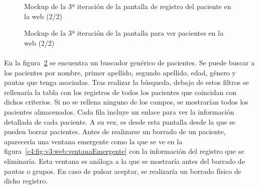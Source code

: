 \begin{figure}[H]
    \centering
    \caption[Mockup de la 3ª iteración de la pantalla de registro del paciente en la web (2/2)]{Mockup de la 3ª iteración de la pantalla de registro del paciente en la web (2/2)}
    \label{c4:fig:v3:web:registroPaciente2}
\end{figure}

\begin{figure}[H]
    \centering
    \caption[Mockup de la 3ª iteración de la pantalla para ver pacientes en la web]{Mockup de la 3ª iteración de la pantalla para ver pacientes en la web (2/2)}
    \label{c4:fig:v3:web:verPacientes}
\end{figure}

\paragraph{}
En la figura~\ref{c4:fig:v3:web:verPacientes} se encuentra un buscador genérico de pacientes. Se puede buscar a los pacientes por nombre, primer apellido, segundo apellido, edad, género y pautas que tenga asociadas. Tras realizar la búsqueda, debajo de estos filtros se rellenaría la tabla con los registros de todos los pacientes que coincidan con dichos criterios. Si no se rellena ninguno de los campos, se mostrarían todos los pacientes almacenados. Cada fila incluye un enlace para ver la información detallada de cada paciente. A su vez, es desde esta pantalla desde la que se pueden borrar pacientes. Antes de realizarse un borrado de un paciente, aparecería una ventana emergente como la que se ve en la figura~\ref{c4:fig:v3:web:ventanaEmergente} con la información del registro que se eliminaría. Esta ventana es análoga a la que se mostraría antes del borrado de pautas o grupos. En caso de pulsar aceptar, se realizaría un borrado físico de dicho registro.

